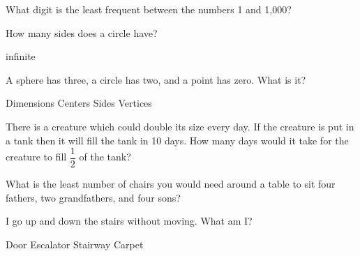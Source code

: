 \begin{questions}
\question What digit is the least frequent between the numbers 1 and 1,000?
\begin{multicols}{4}
\begin{choices}  
\end{choices}
\end{multicols} 

\question How many sides does a circle have?
\begin{multicols}{4}
\begin{choices}  
\choice infinite 
\end{choices}
\end{multicols} 

\question A sphere has three, a circle has two, and a point has zero. What is it?
\begin{multicols}{4}
\begin{choices} 
\CorrectChoice Dimensions
\choice Centers
\choice Sides
\choice Vertices 
\end{choices}
\end{multicols} 

\question There is a creature which could double its size every day. If the creature is put in a tank then it will fill the tank in 10 days. How many days would it take for the creature to fill $\dfrac{1}{2} $ of the tank?
\begin{multicols}{4}
\begin{choices}  
\end{choices}
\end{multicols} 

\question What is the least number of chairs you would need around a table to sit four fathers, two grandfathers, and four sons?
\begin{multicols}{4}
\begin{choices} 
\end{choices}
\end{multicols} 

\question I go up and down the stairs without moving. What am I?
\begin{multicols}{4}
\begin{choices}  
\choice Door
\choice Escalator 
\choice Stairway
\CorrectChoice Carpet
\end{choices}
\end{multicols} 


\end{questions}

